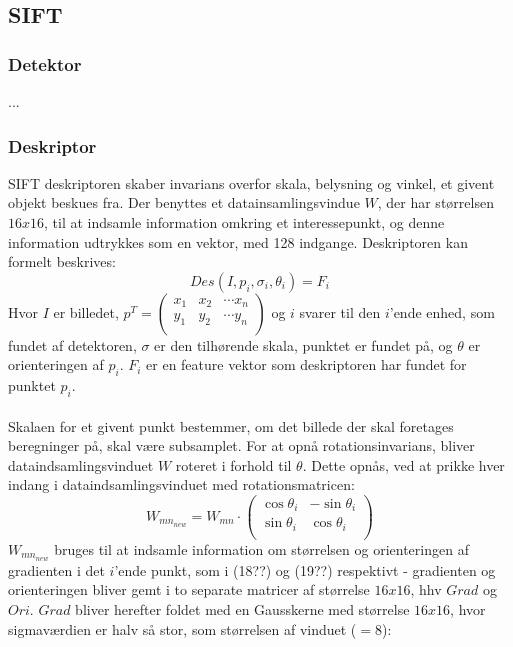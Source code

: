 \subsection{SIFT}
\subsubsection{Detektor}
...
\subsubsection{Deskriptor}
SIFT deskriptoren skaber invarians overfor skala, belysning og vinkel, et givent objekt beskues fra. Der benyttes et datainsamlingsvindue $W$, der har størrelsen $16x16$, til at indsamle information omkring et interessepunkt, og denne information udtrykkes som en vektor, med 128 indgange. Deskriptoren kan formelt beskrives:
\begin{equation}
Des(I, p_i,\sigma_i,\theta_i) = F_i
\end{equation}
Hvor $I$ er billedet, 
$p^T = \begin{pmatrix}
	x_1 & x_2 & \cdots x_n \\
	y_1 & y_2 & \cdots y_n \\
\end{pmatrix}$ og $i$ svarer til den $i$'ende enhed, som fundet af detektoren, $\sigma$ er den tilhørende skala, punktet er fundet på, og $\theta$ er orienteringen af $p_i$. $F_i$ er en feature vektor som deskriptoren har fundet for punktet $p_i$.
\\
\\
Skalaen for et givent punkt bestemmer, om det billede der skal foretages beregninger på, skal være subsamplet. For at opnå rotationsinvarians, bliver dataindsamlingsvinduet $W$ roteret i forhold til $\theta$. Dette opnås, ved at prikke hver indang i dataindsamlingsvinduet med rotationsmatricen:
\begin{equation}
W_{{mn}_{new}} = W_{mn} \cdot
\begin{pmatrix}
  \cos \theta_i & -\sin \theta_i \\
  \sin \theta_i & \cos \theta_i  \\
\end{pmatrix}
\end{equation}
$W_{{mn}_{new}}$ bruges til at indsamle information om størrelsen og orienteringen af gradienten i det $i$'ende punkt, som i (18??) og (19??) respektivt - gradienten og orienteringen bliver gemt i to separate matricer af størrelse $16x16$, hhv $Grad$ og $Ori$. $Grad$ bliver herefter foldet med en Gausskerne med størrelse $16x16$, hvor sigmaværdien er halv så stor, som størrelsen af vinduet ($=8$):
